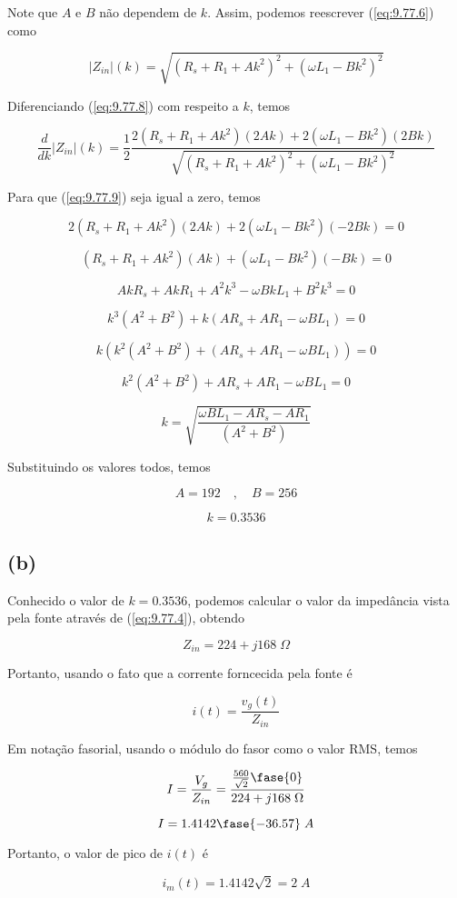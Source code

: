 Note que  \(A\) e \(B\) não dependem de \(k\). Assim, podemos reescrever (\ref{eq:9.77.6}) como

\begin{equation}\label{eq:9.77.8}
    |Z_{in}|(k) = \sqrt{\left(R_s + R_1 + A k^2\right)^2 + \left(\omega L_1 - B k^2\right)^2}
\end{equation}

Diferenciando (\ref{eq:9.77.8}) com respeito a \(k\), temos

\begin{equation}\label{eq:9.77.9}
    \frac{d}{dk}|Z_{in}|(k) = \frac{1}{2}\frac{2(R_s + R_1 + A k^2)(2Ak) + 2(\omega L_1 - B k^2)(2Bk)}{\sqrt{\left(R_s + R_1 + A k^2\right)^2 + \left(\omega L_1 - B k^2\right)^2}}
\end{equation}

Para que (\ref{eq:9.77.9}) seja igual a zero, temos

\[ 2(R_s + R_1 + A k^2)(2Ak) + 2(\omega L_1 - B k^2)(-2Bk) = 0 \]

\[ (R_s + R_1 + A k^2)(Ak) + (\omega L_1 - B k^2)(-Bk) = 0 \]

\[ AkR_s + AkR_1 + A^2k^3 - \omega BkL_1 + B^2k^3 = 0 \]

\[ k^3(A^2+B^2) + k(AR_s + AR_1 - \omega BL_1) = 0 \]

\[ k\left(k^2(A^2+B^2) + (AR_s + AR_1 - \omega BL_1)\right) = 0 \]

\[ k^2(A^2+B^2) + AR_s + AR_1 - \omega BL_1 = 0 \]

\[ k = \sqrt{\frac{\omega BL_1 - AR_s - AR_1 }{(A^2+B^2)}} \]

Substituindo os valores todos, temos

\[ A = 192 \quad , \quad B = 256 \]

\[ \boxed{k = 0.3536} \]

\subsection*{(b)}

Conhecido o valor de \(k = 0.3536\), podemos calcular o valor da impedância vista pela fonte através de (\ref{eq:9.77.4}), obtendo

\[ Z_{in} = 224 + j168 \; \Omega \]

Portanto, usando o fato que a corrente forncecida pela fonte é

\[ i(t) = \frac{v_g(t)}{Z_{in}} \]

Em notação fasorial, usando o módulo do fasor como o valor RMS, temos

\[ I = \frac{V_g}{Z_{in}} = \frac{\frac{560}{\sqrt{2}}\fase{0}}{224 + j168 \; \Omega} \]

\[ I = 1.4142\fase{-36.57} \; A \]

Portanto, o valor de pico de \(i(t)\) é

\[ \boxed{i_m(t) = 1.4142 \sqrt{2} = 2 \; A}  \]

